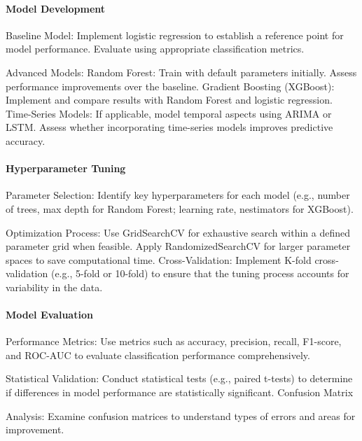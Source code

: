 \documentclass[conference]{IEEEtran}
\begin{document}
\paragraph{Model Development}
\begin{description}
    \item Baseline Model: Implement logistic regression to establish a reference point for model performance. Evaluate using appropriate classification metrics.
    \item Advanced Models: Random Forest: Train with default parameters initially. Assess performance improvements over the baseline. Gradient Boosting (XGBoost): Implement and compare results with Random Forest and logistic regression. Time-Series Models: If applicable, model temporal aspects using ARIMA or LSTM. Assess whether incorporating time-series models improves predictive accuracy.
\end{description}

\paragraph{Hyperparameter Tuning}
\begin{description}
    \item Parameter Selection: Identify key hyperparameters for each model (e.g., number of trees, max depth for Random Forest; learning rate, nestimators for XGBoost). 
    \item Optimization Process: Use GridSearchCV for exhaustive search within a defined parameter grid when feasible. Apply RandomizedSearchCV for larger parameter spaces to save computational time. Cross-Validation: Implement K-fold cross-validation (e.g., 5-fold or 10-fold) to ensure that the tuning process accounts for variability in the data.
\end{description}

\paragraph{Model Evaluation}
\begin{description}
    \item Performance Metrics: Use metrics such as accuracy, precision, recall, F1-score, and ROC-AUC to evaluate classification performance comprehensively. 
    \item Statistical Validation: Conduct statistical tests (e.g., paired t-tests) to determine if differences in model performance are statistically significant. Confusion Matrix 
    \item Analysis: Examine confusion matrices to understand types of errors and areas for improvement.
\end{description}
\end{document}
